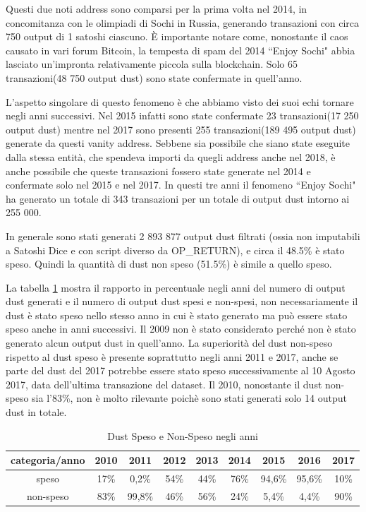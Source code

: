 Questi due noti address sono comparsi per la prima volta nel 2014, in concomitanza con le olimpiadi di Sochi in Russia, generando transazioni con circa 750 output di 1 satoshi ciascuno. È importante notare come, nonostante il caos causato in vari forum Bitcoin, la tempesta di spam del 2014 ``Enjoy Sochi" abbia lasciato un'impronta relativamente piccola sulla blockchain. Solo 65 transazioni(48 750 output dust) sono state confermate in quell'anno.

L'aspetto singolare di questo fenomeno è che abbiamo visto dei suoi echi tornare negli anni successivi. Nel 2015 infatti sono state confermate 23 transazioni(17 250 output dust) mentre nel 2017 sono presenti 255 transazioni(189 495 output dust) generate da questi vanity address. Sebbene sia possibile che siano state eseguite dalla stessa entità, che spendeva importi da quegli address anche nel 2018, è anche possibile che queste transazioni fossero state generate nel 2014 e confermate solo nel 2015 e nel 2017. In questi tre anni il fenomeno ``Enjoy Sochi" ha generato un totale di 343 transazioni per un totale di output dust intorno ai 255 000.

In generale sono stati generati 2 893 877 output dust filtrati (ossia non imputabili a Satoshi Dice e con script diverso da OP\_RETURN), e circa il 48.5\% è stato speso. Quindi la quantità di dust non speso (51.5\%) è simile a quello speso. 

La tabella \ref{tab:dust_spent_unspent} mostra il rapporto in percentuale negli anni del numero di output dust generati e il numero di output dust spesi e non-spesi, non necessariamente il dust è stato speso nello stesso anno in cui è stato generato ma può essere stato speso anche in anni successivi. Il 2009 non è stato considerato perché non è stato generato alcun output dust in quell'anno. La superiorità del dust non-speso rispetto al dust speso è presente soprattutto negli anni 2011 e 2017, anche se parte del dust del 2017 potrebbe essere stato speso successivamente al 10 Agosto 2017, data dell'ultima transazione del dataset. Il 2010, nonostante il dust non-speso sia l'83\%, non è molto rilevante poichè sono stati generati solo 14 output dust in totale. 
\begin{table}[H]
    \centering
    \begin{tabular}{|c|c|c|c|c|c|c|c|c|}
        \hline
           categoria/anno   & 2010 & 2011 & 2012 & 2013 & 2014 & 2015 & 2016 & 2017\\
        \hline 
         speso &  17\% & 0,2\% & 54\% & 44\% & 76\% & 94,6\% & 95,6\% & 10\% \\
         \hline
         non-speso & 83\% & 99,8\% & 46\% & 56\% & 24\% & 5,4\% & 4,4\% & 90\%  \\
         \hline
    \end{tabular}
    \caption{Dust Speso e Non-Speso negli anni}
    \label{tab:dust_spent_unspent}
\end{table}
